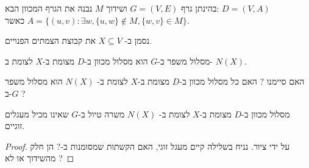 בהינתן גרף 
$G = (V, E)$
ושידוך $M$ נבנה את הגרף המכוון הבא:
$D = (V, A)$
\\
כאשר 
$A = \{(u, v) : \exists w, \{u, w\} \notin M, \{w, v\} \in M\}$.
\begin{figure}[h]
\centering

\end{figure}
נסמן ב-%
$X \subseteq V$
את קבוצת הצמתים הפנויים.
\begin{claim}
מסלול משפר ב-$G$ הוא מסלול מכוון ב-$D$ מצומת ב-$X$ לצומת ב-%
$N(X)$.
\end{claim}
האם סיימנו ? האם כל מסלול מכוון ב-$D$ מצומת ב-$X$ לצומת ב-%
$N(X)$
הוא מסלול משפר ב-$G$ ?
\begin{claim}
מסלול מכוון ב-$D$ מצומת ב-$X$ לצומת ב-%
$N(X)$
משרה טיול ב-$G$ שאינו מכיל מעגלים זוגיים.
\end{claim}

\begin{proof}
על ידי ציור. 
נניח בשלילה קיים מעגל זוגי, האם הקשתות שמסומנות ב-? הן חלק מהשידוך או לא ?
\end{proof}

\begin{figure}[h]
\centering

\end{figure}
